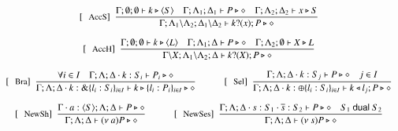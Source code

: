 \begin{figure}[!t]
\[\begin{array}{c}
		\trule{AccS}~~\tree{
			\Gamma; \emptyset; \emptyset \proves k \hastype \chtype{S}
			\quad
			\Gamma; \Lambda_1; \Delta_1 \proves P \hastype \Proc
			\quad
			\Gamma; \Lambda_2; \Delta_2 \proves x \hastype S
		}{
			\Gamma; \Lambda_1 \backslash \Lambda_2; \Delta_1 \backslash \Delta_2 \proves \binp{k}{x} P \hastype \Proc
		}
		\\[6mm]

		\trule{AccH}~~\tree{
			\Gamma; \emptyset; \emptyset \proves k \hastype \chtype{L}
			\quad
			\Gamma; \Lambda_1; \Delta \proves P \hastype \Proc
			\quad
			\Gamma; \Lambda_2; \es \proves X \hastype L
		}{
			\Gamma \backslash X; \Lambda_1 \backslash \Lambda_2; \Delta \proves \binp{k}{X} P \hastype \Proc
		}
		\\[6mm]


		\trule{Bra}~~\tree{
			 \forall i \in I \quad \Gamma; \Lambda; \Delta \cat k:S_i \proves P_i \hastype \Proc
		}{
			\Gamma; \Lambda; \Delta \cat k: \btbra{l_i:S_i}_{i \in I} \proves \bbra{k}{l_i:P_i}_{i \in I}\hastype \Proc
		}
		\qquad\quad 
	 	\trule{Sel}~~\tree{
			\Gamma; \Lambda; \Delta \cat k: S_j  \proves P \hastype \Proc \quad j \in I
		}{
			\Gamma; \Lambda; \Delta \cat k:\btsel{l_i:S_i}_{i \in I} \proves \bsel{k}{l_j} P \hastype \Proc
		}
		\\[6mm]

%

		\trule{NewSh}~~\tree{
			\Gamma\cat a:\chtype{S} ; \Lambda; \Delta \proves P \hastype \Proc
		}{
			\Gamma; \Lambda; \Delta \proves \news{a} P \hastype \Proc}
		\qquad\quad
		\trule{NewSes}~~\tree{
			\Gamma; \Lambda; \Delta \cat s:S_1 \cat \dual{s}: S_2 \proves P \hastype \Proc \quad S_1 \dualof S_2
		}{
			\Gamma; \Lambda; \Delta \proves \news{s} P \hastype \Proc
		}
		\\[6mm]


\end{array}\]
\end{figure}
